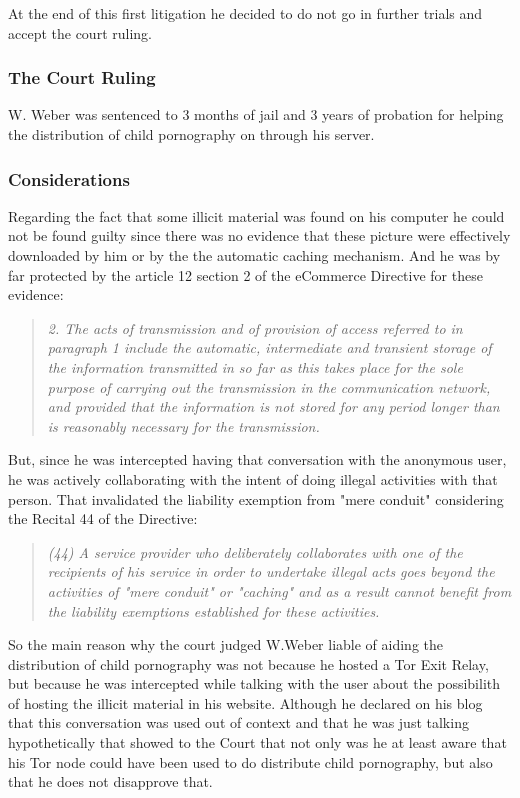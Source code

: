 \documentclass[runningheads,a4paper]{llncs}
\begin{document}
At the end of this first litigation he decided to do not go in further trials and accept the court ruling.

\subsubsection{The Court Ruling}
W. Weber was sentenced to 3 months of jail and 3 years of probation for helping the distribution of child pornography on through his server.

\subsubsection{Considerations}
Regarding the fact that some illicit material was found on his computer he could not be found guilty since there was no evidence that these picture were effectively downloaded by him or by the the automatic caching mechanism. And he was by far protected by the article 12 section 2 of the eCommerce Directive for these evidence:

\begin{quote}
    \textit{2. The acts of transmission and of provision of access referred to in paragraph 1 include the automatic, intermediate and transient storage of the information transmitted in so far as this takes place for the sole purpose of carrying out the transmission in the communication network, and provided that the information is not stored for any period longer than is reasonably necessary for the transmission.}
\end{quote}

But, since he was intercepted having that conversation with the anonymous user, he was actively collaborating with the intent of doing illegal activities with that person. That invalidated the liability exemption from "mere conduit" considering the Recital 44 of the Directive:

\begin{quote}
    \textit{
(44) A service provider who deliberately collaborates with one of the recipients of his service in order to undertake illegal acts goes beyond the activities of "mere conduit" or "caching" and as a result cannot benefit from the liability exemptions established for these activities.}
\end{quote}

So the main reason why the court judged W.Weber liable of aiding the distribution of child pornography was not because he hosted a Tor Exit Relay, but because he was intercepted while talking with the user about the possibilith of hosting the illicit material in his website.
Although he declared on his blog that this conversation was used out of context and that he was just talking hypothetically that showed to the Court that not only was he at least aware that his Tor node could have been used to do distribute child pornography, but also that he does not disapprove that.
\end{document}
